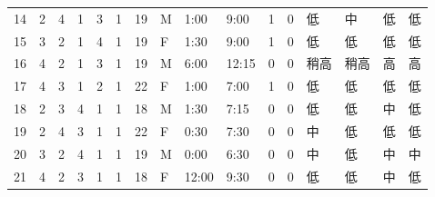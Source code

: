 \begin{table}[htbp]
{\begin{tabular}{llllllllllllllll}
14                  & 2                    & 4                    & 1                    & 3                    & 1                  & 19                     & M                   & 1:00                  & 9:00                  & 1                    & 0                    & 低     & 中     & 低     & 低     \\
15                  & 3                    & 2                    & 1                    & 4                    & 1                  & 19                     & F                   & 1:30                  & 9:00                  & 1                    & 0                    & 低     & 低     & 低     & 低     \\
16                  & 4                    & 2                    & 1                    & 3                    & 1                  & 19                     & M                   & 6:00                  & 12:15                 & 0                    & 0                    & 稍高    & 稍高    & 高     & 高     \\
17                  & 4                    & 3                    & 1                    & 2                    & 1                  & 22                     & F                   & 1:00                  & 7:00                  & 1                    & 0                    & 低     & 低     & 低     & 低     \\
18                  & 2                    & 3                    & 4                    & 1                    & 1                  & 18                     & M                   & 1:30                  & 7:15                  & 0                    & 0                    & 低     & 低     & 中     & 低     \\
19                  & 2                    & 4                    & 3                    & 1                    & 1                  & 22                     & F                   & 0:30                  & 7:30                  & 0                    & 0                    & 中     & 低     & 低     & 低     \\
20                  & 3                    & 2                    & 4                    & 1                    & 1                  & 19                     & M                   & 0:00                  & 6:30                  & 0                    & 0                    & 中     & 低     & 中     & 中     \\
21                  & 4                    & 2                    & 3                    & 1                    & 1                  & 18                     & F                   & 12:00                 & 9:30                  & 0                    & 0                    & 低     & 低     & 中     & 低     \\

\end{tabular}}
\end{table}
